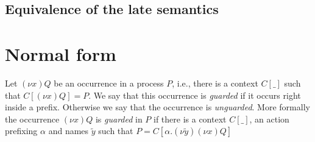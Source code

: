 % 
% 
\subsection{Equivalence of the late semantics}

\section{Normal form}

\begin{definition}
  Let $(\nu x)Q$ be an occurrence in a process $P$, i.e., there is a context $C[\_]$ such that $C[(\nu x)Q]=P$. We say that this occurrence is \emph{guarded} if it occurs right inside a prefix. Otherwise we say that the occurrence is \emph{unguarded}. More formally the occurrence $(\nu x)Q$ is \emph{guarded} in $P$ if there is a context $C[\_]$, an action prefixing $\alpha$ and names $\tilde{y}$ such that $P=C[\alpha.(\nu \tilde{y})(\nu x)Q]$
\end{definition}

